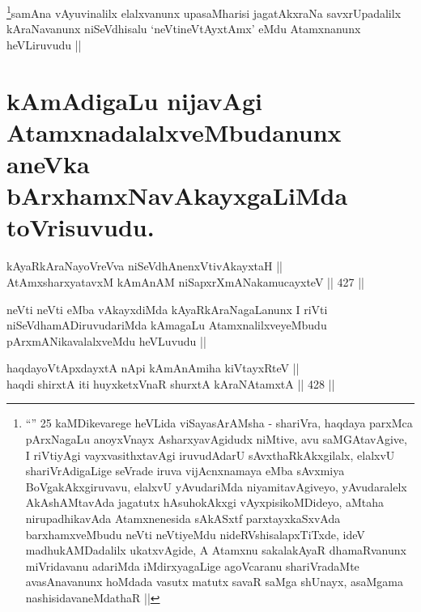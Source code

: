 \begin{artha}
\footnote{``\stext'' 25 kaMDikevarege heVLida viSayasArAMsha -
  shariVra, haqdaya parxMca pArxNagaLu anoyxVnayx AsharxyavAgidudx
  niMtive, avu saMGAtavAgive, I riVtiyAgi vayxvasithxtavAgi
  iruvudAdarU sAvxthaRkAkxgilalx, elalxvU shariVrAdigaLige seVrade
  iruva vijAcnxnamaya eMba sAvxmiya BoVgakAkxgiruvavu, elalxvU
  yAvudariMda niyamitavAgiveyo, yAvudaralelx AkAshAMtavAda jagatutx
  hAsuhokAkxgi vAyxpisikoMDideyo, aMtaha nirupadhikavAda Atamxnenesida
  sAkASxtf parxtayxkaSxvAda barxhamxveMbudu neVti neVtiyeMdu
  nideRVshisalapxTiTxde, ideV madhukAMDadalilx ukatxvAgide, A Atamxnu
  sakalakAyaR dhamaRvanunx miVridavanu adariMda iMdirxyagaLige
  agoVcaranu shariVradaMte avasAnavanunx hoMdada vasutx matutx savaR
  saMga shUnayx, asaMgama nashisidavaneMdathaR ||}samAna vAyuvinalilx elalxvanunx upasaMharisi jagatAkxraNa
savxrUpadalilx kAraNavanunx niSeVdhisalu `neVtineVtAyxtAmx' eMdu
Atamxnanunx heVLiruvudu ||
\end{artha}

\section*{kAmAdigaLu nijavAgi AtamxnadalalxveMbudanunx aneVka
  bArxhamxNavAkayxgaLiMda toVrisuvudu.}


\begin{shl}
kAyaRkAraNayoVreVva niSeVdhAnenxVtivAkayxtaH || \\
AtAmxsharxyatavxM kAmAnAM niSapxrXmANakamucayxteV ||  427 ||  
\end{shl}

\begin{artha}
neVti neVti eMba vAkayxdiMda kAyaRkAraNagaLanunx I riVti
niSeVdhamADiruvudariMda kAmagaLu AtamxnalilxveyeMbudu
pArxmANikavalalxveMdu heVLuvudu ||
\end{artha}


\begin{shl}
haqdayoVtApxdayxtA nApi kAmAnAmiha kiVtayxRteV || \\
haqdi shirxtA iti huyxketxVnaR shurxtA kAraNAtamxtA ||  428 ||  
\end{shl}

